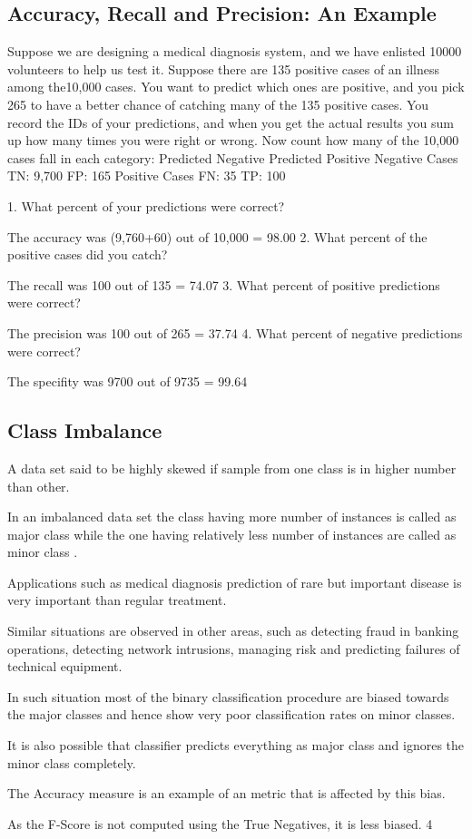 \documentclass[a4paper,12pt]{article}
\begin{document}
\subsection{Accuracy, Recall and Precision: An Example}
Suppose we are designing a medical diagnosis system, and we have enlisted 10000 volunteers to
help us test it. Suppose there are 135 positive cases of an illness among the10,000 cases. You want
to predict which ones are positive, and you pick 265 to have a better chance of catching many of
the 135 positive cases. You record the IDs of your predictions, and when you get the actual results
you sum up how many times you were right or wrong.
Now count how many of the 10,000 cases fall in each category:
Predicted Negative Predicted Positive
Negative Cases TN: 9,700 FP: 165
Positive Cases FN: 35 TP: 100


1. What percent of your predictions were correct?
\item  The accuracy was (9,760+60) out of 10,000 = 98.00%
2. What percent of the positive cases did you catch?
\item  The recall was 100 out of 135 = 74.07%
3. What percent of positive predictions were correct?
\item  The precision was 100 out of 265 = 37.74%
4. What percent of negative predictions were correct?
\item  The specifity was 9700 out of 9735 = 99.64%


\subsection{Class Imbalance}
\item  A data set said to be highly skewed if sample from one class is in higher number than other.
\item  In an imbalanced data set the class having more number of instances is called as major class
while the one having relatively less number of instances are called as minor class .
\item  Applications such as medical diagnosis prediction of rare but important disease is very important
than regular treatment.
\item  Similar situations are observed in other areas, such as detecting fraud in banking operations,
detecting network intrusions, managing risk and predicting failures of technical equipment.
\item  In such situation most of the binary classification procedure are biased towards the major
classes and hence show very poor classification rates on minor classes.
\item  It is also possible that classifier predicts everything as major class and ignores the minor class
completely.
\item  The Accuracy measure is an example of an metric that is affected by this bias.
\item  As the F-Score is not computed using the True Negatives, it is less biased.
4
\end{document}
